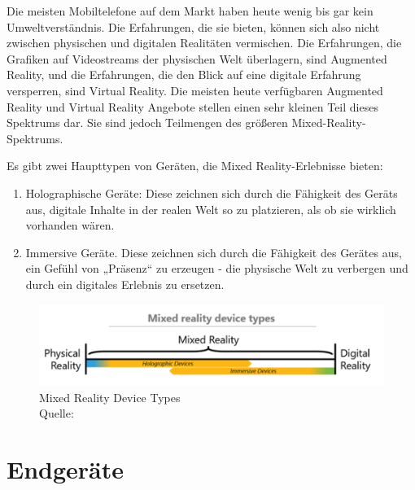 Die meisten Mobiltelefone auf dem Markt haben heute wenig bis gar kein Umweltverständnis. Die Erfahrungen, die sie bieten, können sich also nicht zwischen physischen und digitalen Realitäten vermischen. Die Erfahrungen, die Grafiken auf Videostreams der physischen Welt überlagern, sind Augmented Reality, und die Erfahrungen, die den Blick auf eine digitale Erfahrung versperren, sind Virtual Reality. Die meisten heute verfügbaren Augmented Reality und Virtual Reality Angebote stellen einen sehr kleinen Teil dieses Spektrums dar. Sie sind jedoch Teilmengen des größeren Mixed-Reality-Spektrums. \newline 

\noindent Es gibt zwei Haupttypen von Geräten, die Mixed Reality-Erlebnisse bieten:
\begin{enumerate}[leftmargin=*,label= \arabic*:]
	 \item Holographische Geräte: Diese zeichnen sich durch die Fähigkeit des Geräts aus, digitale Inhalte in der realen Welt so zu platzieren, als ob sie wirklich vorhanden wären. 
	  \item Immersive Geräte. Diese zeichnen sich durch die Fähigkeit des Gerätes aus, ein Gefühl von „Präsenz“ zu erzeugen - die physische Welt zu verbergen und durch ein digitales Erlebnis zu ersetzen.
\end{enumerate}

\begin{figure}[ht]
	\centering
	\includegraphics[width=\textwidth,height=\textheight,keepaspectratio]{images/MixedRealityDeviceTypes.png}
	\caption{Mixed Reality Device Types \\ Quelle: \cite[vgl.][]{BrandonBray}}
	\label{Mixed-Reality2}
\end{figure}

\section{Endgeräte}

